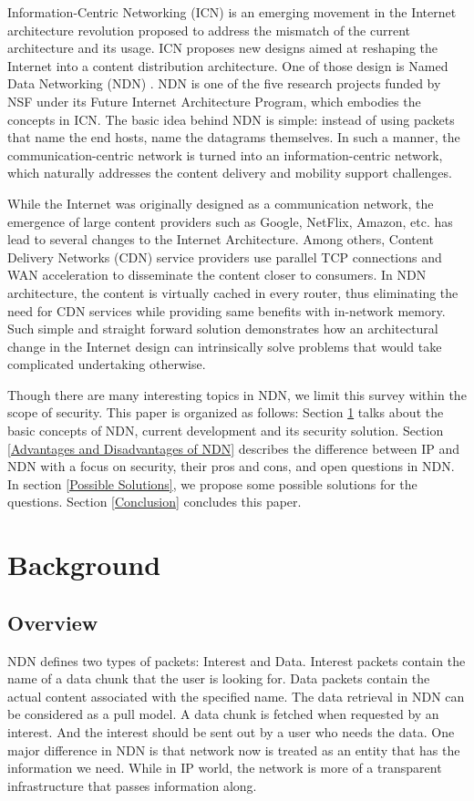 \documentclass[conference,compsoc]{IEEEtran}
\begin{document}
Information-Centric Networking (ICN) \cite{jacobson2006new} is an emerging movement in the Internet architecture revolution proposed to address the mismatch of the current architecture and its usage. ICN proposes new designs aimed at reshaping the Internet into a content distribution architecture. One of those design is Named Data Networking (NDN) \cite{jacobson2009networking,zhang2014named}. NDN is one of the five research projects funded by NSF under its Future Internet Architecture Program, which embodies the concepts in ICN. The basic idea behind NDN is simple: instead of using packets that name the end hosts, name the datagrams themselves. In such a manner, the communication-centric network is turned into an information-centric network, which naturally addresses the content delivery and mobility support challenges.

 While the Internet was originally designed as a communication network, the emergence of large content providers such as Google, NetFlix, Amazon, etc. has lead to several changes to the Internet Architecture. Among others, Content Delivery Networks (CDN) service providers use parallel TCP connections \cite{akiyama2015saps} and WAN acceleration \cite{zhang2015using} to disseminate the content closer to consumers. In NDN architecture, the content is virtually cached in every router, thus eliminating the need for CDN services while providing same benefits with in-network memory. Such simple and straight forward solution demonstrates how an architectural change in the Internet design can intrinsically solve problems that would take complicated undertaking otherwise. 

Though there are many interesting topics in NDN, we limit this survey within the scope of security. This paper is organized as follows: Section \ref{background} talks about the basic concepts of NDN, current development and its security solution. Section \ref{Advantages and Disadvantages of NDN} describes the difference between IP and NDN with a focus on security, their pros and cons, and open questions in NDN. In section \ref{Possible Solutions}, we propose some possible solutions for the questions. Section \ref{Conclusion} concludes this paper.



\section{Background}
\label{background}
\subsection{Overview}
NDN defines two types of packets: Interest and Data. Interest packets contain the name of a data chunk that the user is looking for. Data packets contain the actual content associated with the specified name. The data retrieval in NDN can be considered as a pull model. A data chunk is fetched when requested by an interest. And the interest should be sent out by a user who needs the data. One major difference in NDN is that network now is treated as an entity that has the information we need. While in IP world, the network is more of a transparent infrastructure that passes information along.
\end{document}
